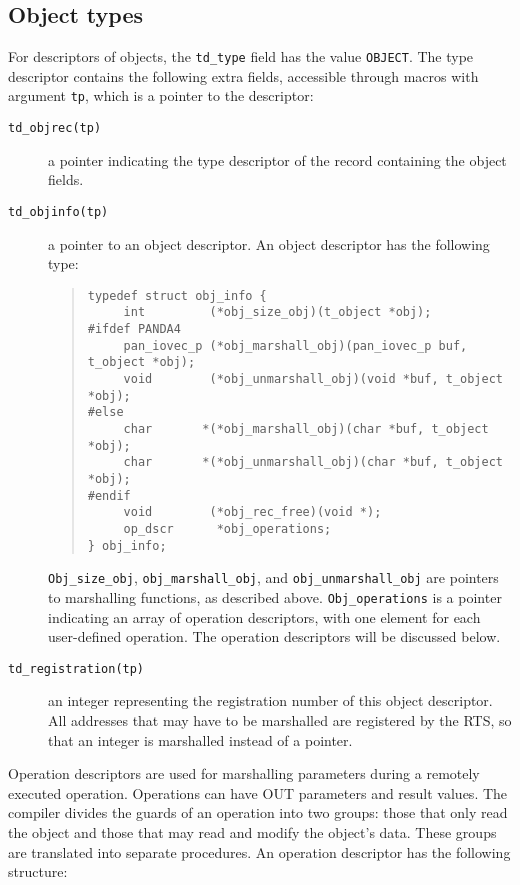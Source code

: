 \documentclass[10pt]{article}
\begin{document}
\subsection{Object types}
For descriptors of objects, the \verb+td_type+
field has the value \verb+OBJECT+.
The type descriptor contains the following extra fields, accessible through
macros with argument \verb+tp+, which is a pointer to the descriptor:
\begin{description}
\item[{\tt td\_objrec(tp)}]
a pointer indicating the type descriptor of the record containing the
object fields.
\item[{\tt td\_objinfo(tp)}]
a pointer to an object descriptor. An object descriptor has the following type:
\begin{quote}
\begin{verbatim}
typedef struct obj_info {
     int         (*obj_size_obj)(t_object *obj);
#ifdef PANDA4
     pan_iovec_p (*obj_marshall_obj)(pan_iovec_p buf, t_object *obj);
     void        (*obj_unmarshall_obj)(void *buf, t_object *obj);
#else
     char       *(*obj_marshall_obj)(char *buf, t_object *obj);
     char       *(*obj_unmarshall_obj)(char *buf, t_object *obj);
#endif
     void        (*obj_rec_free)(void *);
     op_dscr      *obj_operations;
} obj_info;
\end{verbatim}
\end{quote}
\verb+Obj_size_obj+, \verb+obj_marshall_obj+,
and \verb+obj_unmarshall_obj+
are pointers to marshalling functions, as described above.
\verb+Obj_operations+
is
a pointer indicating an array of operation descriptors, with one
element for each user-defined operation.
The operation descriptors will be discussed below.
\item[{\tt td\_registration(tp)}]
an integer representing the registration number of this object descriptor.
All addresses that may have to be marshalled are registered by the
RTS, so that an integer is marshalled instead of a pointer.
\end{description}
Operation descriptors are used for marshalling parameters during a
remotely executed operation.
Operations can have OUT parameters and result values.
The compiler divides the guards of an operation into two groups:
those that only read the object and those that may read
and modify the object's data.
These groups are translated into separate procedures.
An operation descriptor has the following structure:
\end{document}
